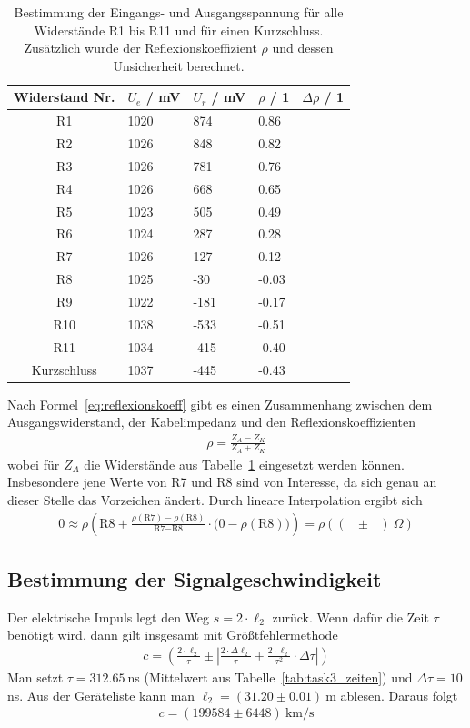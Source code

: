 \documentclass{article}
\begin{document}
\begin{table}[H]
\centering
\caption{Bestimmung der Eingangs- und Ausgangsspannung für alle Widerstände R1 bis R11 und für einen Kurzschluss. Zusätzlich wurde der Reflexionskoeffizient $\rho$ und dessen Unsicherheit berechnet.}
\label{tab:reflexionskoeff}
\begin{tabular}{c|llll}
Widerstand Nr. & $U_e$ / mV & $U_r$ / mV & $\rho$ / 1 & $\Delta \rho$ / 1 \\
\hline
R1 & 1020 & 874 & 0.86 & \\
R2 & 1026 & 848 & 0.82 & \\
R3 & 1026 & 781 & 0.76 & \\
R4 & 1026 & 668 & 0.65 & \\
R5 & 1023 & 505 & 0.49 & \\
R6 & 1024 & 287 & 0.28 & \\
R7 & 1026 & 127 & 0.12 & \\
R8 & 1025 & -30 & -0.03 & \\
R9 & 1022 & -181 & -0.17 & \\
R10 & 1038 & -533 & -0.51 & \\
R11 & 1034 & -415 & -0.40 & \\
Kurzschluss & 1037 & -445 & -0.43 & 
\end{tabular}
\end{table}


Nach Formel~\eqref{eq:reflexionskoeff} gibt es einen Zusammenhang zwischen dem Ausgangswiderstand, der Kabelimpedanz und den Reflexionskoeffizienten
\begin{align*}
\rho = \frac{Z_A-Z_K}{Z_A+Z_K}
\end{align*}
wobei für $Z_A$ die Widerstände aus Tabelle~\ref{tab:reflexionskoeff} eingesetzt werden können. Insbesondere jene Werte von R7 und R8 sind von Interesse, da sich genau an dieser Stelle das Vorzeichen ändert. Durch lineare Interpolation ergibt sich
\begin{align*}
0 \approx \rho\left(\text{R8} + \frac{\rho(\text{R7}) - \rho(\text{R8})}{\text{R7}-\text{R8}} \cdot \big(0 -\rho(\text{R8}) \big)  \right) = \rho\left(\left(~~~ \pm ~~~\right)~\Omega\right)
\end{align*}




\subsection{Bestimmung der Signalgeschwindigkeit}

Der elektrische Impuls legt den Weg $s = 2\cdot \ell_2$ zurück. Wenn dafür die Zeit $\tau$ benötigt wird, dann gilt insgesamt mit Größtfehlermethode
\begin{align*}
c = \left(\frac{2\cdot \ell_2}{\tau} \pm \left|\frac{2\cdot \Delta \ell_2}{\tau} + \frac{2\cdot \ell_2}{\tau^2}\cdot \Delta \tau\right|\right)
\end{align*}
Man setzt $\tau = 312.65~$ns (Mittelwert aus Tabelle~\ref{tab:task3_zeiten}) und $\Delta \tau = 10~$ns. Aus der Geräteliste kann man $\ell_2 = (31.20 \pm 0.01)~$m ablesen. Daraus folgt
\begin{align*}
c = \left(199584 \pm  6448\right)~\text{km/s}
\end{align*}
\end{document}
